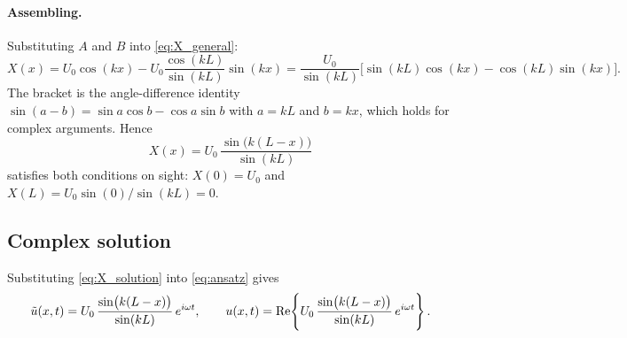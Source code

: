 \paragraph{Assembling.} Substituting $A$ and $B$ into \cref{eq:X_general}:
\begin{equation}
  X(x) = U_0\cos(kx) - U_0\frac{\cos(kL)}{\sin(kL)}\sin(kx)
       = \frac{U_0}{\sin(kL)}\Big[\sin(kL)\cos(kx) - \cos(kL)\sin(kx)\Big].
\end{equation}
The bracket is the angle-difference identity
$\sin(a-b) = \sin a\cos b - \cos a\sin b$ with $a = kL$ and $b = kx$, which
holds for complex arguments. Hence
\begin{equation}
  \boxed{\;X(x) = U_0\,\frac{\sin\!\big(k(L-x)\big)}{\sin(kL)}\;}
  \label{eq:X_solution}
\end{equation}
 satisfies both conditions on sight: $X(0) = U_0$ and
$X(L) = U_0\sin(0)/\sin(kL) = 0$.

\subsection{Complex solution}

Substituting \cref{eq:X_solution} into \cref{eq:ansatz} gives
\begin{equation}
  \tilde u(x,t) = U_0\,\frac{\sin\!\big(k(L-x)\big)}{\sin(kL)}\, e^{i\omega t},
  \qquad
  u(x,t) = \operatorname{Re}\!\left\{ U_0\,\frac{\sin\!\big(k(L-x)\big)}{\sin(kL)}\, e^{i\omega t} \right\}.
  \label{eq:u_complex}
\end{equation}
